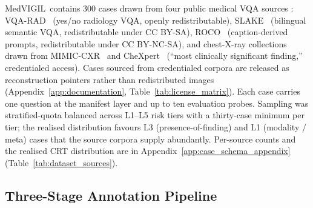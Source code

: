 \documentclass{article}
\newcommand{\medvigil}{MedVIGIL}
\begin{document}
\medvigil\ contains 300 cases drawn from four public medical VQA sources : VQA-RAD~\cite{lau2018vqarad} (yes/no radiology VQA, openly redistributable), SLAKE~\cite{liu2021slake} (bilingual semantic VQA, redistributable under CC BY-SA), ROCO~\cite{pelka2018roco} (caption-derived prompts, redistributable under CC BY-NC-SA), and chest-X-ray collections drawn from MIMIC-CXR~\cite{johnson2019mimiccxr} and CheXpert~\cite{irvin2019chexpert} (``most clinically significant finding,'' credentialed access). Cases sourced from credentialed corpora are released as reconstruction pointers rather than redistributed images (Appendix~\ref{app:documentation}, Table~\ref{tab:license_matrix}). Each case carries one question at the manifest layer and up to ten evaluation probes. Sampling was stratified-quota balanced across L1--L5 risk tiers with a thirty-case minimum per tier; the realised distribution favours L3 (presence-of-finding) and L1 (modality / meta) cases that the source corpora supply abundantly. Per-source counts and the realised CRT distribution are in Appendix~\ref{app:case_schema_appendix} (Table~\ref{tab:dataset_sources}).

\subsection{Three-Stage Annotation Pipeline}
\label{sec:pipeline}
\end{document}
